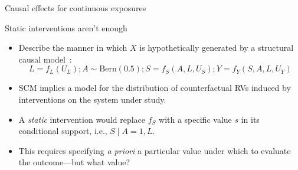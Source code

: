 \documentclass{beamer}
\begin{document}
\begin{frame}[standout]
  Causal effects for continuous exposures
\end{frame}


\begin{frame}[c]{Static interventions aren't enough}

\begin{center}
\begin{itemize}
  \itemsep8pt
  \item Describe the manner in which $X$ is hypothetically generated by a
    structural causal model~\citep{pearl2009causality}:
    \begin{equation*}
      L = f_L(U_L); A \sim \text{Bern}(0.5);
      S = f_S(A, L, U_S); Y = f_Y(S, A, L, U_Y)
    \end{equation*}
  \item SCM implies a model for the distribution of counterfactual RVs induced
    by interventions on the system under study.
  \item A \textit{static} intervention would replace $f_S$ with a specific
    value $s$ in its conditional support, i.e., $S \mid A = 1, L$.
  \item This requires specifying \textit{a priori} a particular value under
    which to evaluate the outcome---but what value?
\end{itemize}
\end{center}

\note{
}

\end{frame}

\end{document}
